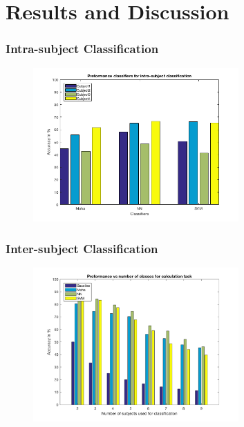 \documentclass[unknownkeysallowed]{beamer}
\begin{document}
\section{Results and Discussion}
\begin{frame}
	\frametitle{Intra-subject Classification}
        \begin{figure}[hbtp]
    	\centering
    	\includegraphics[width=0.7\textwidth]{base_total_all}   	
    	\label{Intra-Subject classification}
    \end{figure} 
\end{frame}

\begin{frame}
	\frametitle{Inter-subject Classification}
     \begin{figure}[hbtp]
    	\centering
    	\includegraphics[width=0.7\textwidth]{calc_base}   	
    	\label{Inter-Subject classification for calculation}
    \end{figure} 
\end{frame}
\end{document}
